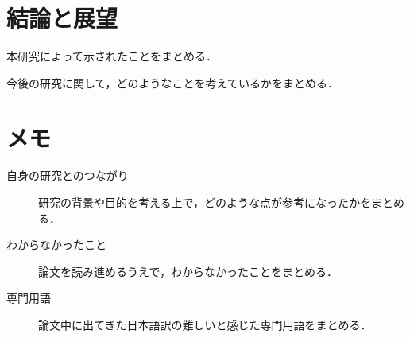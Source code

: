 \documentclass[12pt,a4paper]{jsarticle}
\begin{document}
\section{結論と展望}
\begin{description}[leftmargin=*]
  \item[結論] 本研究によって示されたことをまとめる．
  \item[展望] 今後の研究に関して，どのようなことを考えているかをまとめる．
\end{description}

\section{メモ}
\begin{description}
    \item[自身の研究とのつながり] 研究の背景や目的を考える上で，どのような点が参考になったかをまとめる．
    \item[わからなかったこと] 論文を読み進めるうえで，わからなかったことをまとめる．
    \item[専門用語] 論文中に出てきた日本語訳の難しいと感じた専門用語をまとめる．
\end{description}


\printbibliography[title=参考文献]
\end{document}
